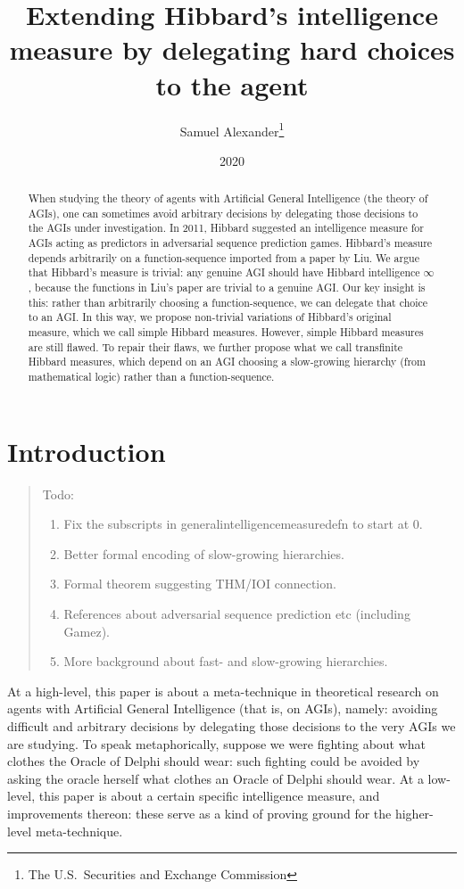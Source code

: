 \documentclass{article}
\title{Extending Hibbard's intelligence measure by delegating hard choices to the agent}
\author{Samuel Alexander\thanks{The U.S.\ Securities and Exchange Commission}}
\date{2020}
\begin{document}
\maketitle

\begin{abstract}
When studying the theory of agents with Artificial General Intelligence
(the theory of AGIs), one can sometimes avoid arbitrary decisions by
delegating those decisions to the AGIs under investigation.
In 2011, Hibbard suggested an intelligence measure for AGIs acting as
predictors in adversarial sequence prediction games. Hibbard's measure
depends arbitrarily on a function-sequence
imported from a paper by Liu. We argue that Hibbard's measure is trivial:
any genuine AGI should have Hibbard intelligence $\infty$,
because the functions in Liu's paper are
trivial to a genuine AGI. Our key insight is this: rather than
arbitrarily choosing a function-sequence, we can delegate that choice to an AGI.
In this way, we propose
non-trivial variations of Hibbard's original measure, which we call
simple Hibbard measures.
However, simple Hibbard measures are still flawed. To repair their flaws,
we further propose what we call transfinite Hibbard measures,
which depend on an AGI choosing a slow-growing hierarchy (from mathematical
logic) rather than a function-sequence.
\end{abstract}

\section{Introduction}

\begin{quote}
    Todo:
    \begin{enumerate}
        \item Fix the subscripts in generalintelligencemeasuredefn to start at 0.
        \item Better formal encoding of slow-growing hierarchies.
        \item Formal theorem suggesting THM/IOI connection.
        \item References about adversarial sequence prediction etc (including Gamez).
        \item More background about fast- and slow-growing hierarchies.
    \end{enumerate}
\end{quote}

At a high-level, this paper is about a meta-technique in theoretical research
on agents with Artificial General Intelligence (that is, on AGIs), namely:
avoiding difficult and arbitrary decisions by delegating those decisions to the
very AGIs we are studying. To speak metaphorically, suppose we were fighting about
what clothes the Oracle of Delphi should wear: such fighting could be avoided
by asking the oracle herself what clothes an Oracle of Delphi should wear. At
a low-level, this paper is about a certain specific intelligence measure, and
improvements thereon: these serve as a kind of proving ground for the
higher-level meta-technique.
\end{document}
